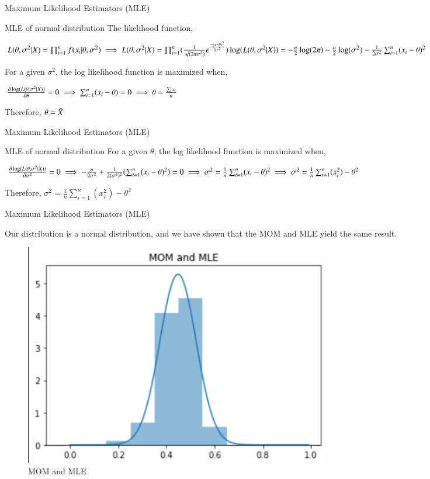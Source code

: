 \documentclass{beamer}
\begin{document}
\begin{frame}{Maximum Likelihood Estimators (MLE)}
\begin{block}{MLE of normal distribution}
The likelihood function,
\begin{center}
    $L(\theta, \sigma^2|X) = \prod_{i=1}^n f(x_i|\theta,\sigma^2)\\
    \implies L(\theta, \sigma^2|X) = \prod_{i=1}^n (\frac{1}{\sqrt(2\pi\sigma^2)}e^{\frac{-(x-\theta)^2}{2\sigma^2}})\\
    \log(L(\theta, \sigma^2|X)) = -\frac{n}{2}\log(2\pi)  -\frac{n}{2}\log(\sigma^2)  -\frac{1}{2\sigma^2}\sum_{i=1}^{n}(x_i-\theta)^2$
\end{center}
For a given $\sigma^2$, the log likelihood function is maximized when,
\begin{center}
 $\frac{\partial \log(L(\theta, \sigma^2|X))}{\partial \theta} = 0 \\
  \implies \sum_{i=1}^{n}(x_i-\theta) = 0
  \implies \theta = \frac{ \sum x_i}{n}$
\end{center}
Therefore, $\theta = \Bar{X}$
\end{block}
\end{frame}
\begin{frame}{Maximum Likelihood Estimators (MLE)}
\begin{block}{MLE of normal distribution}
For a given $\theta$, the log likelihood function is maximized when,
\begin{center}
 $\frac{\partial \log(L(\theta, \sigma^2|X))}{\partial \sigma^2} = 0 \\
  \implies -\frac{n}{2\sigma^2} + \frac{1}{2(\sigma^2)^2}(\sum_{i=1}^{n}(x_i-\theta)^2) = 0\\
  \implies \sigma^2 = \frac{1}{n}\sum_{i=1}^{n}(x_i-\theta)^2 \\
  \implies  \sigma^2 = \frac{1}{n}\sum_{i=1}^{n}(x_i^2) - \theta^2$
\end{center}
Therefore, $\sigma^2 = \frac{1}{n}\sum_{i=1}^{n}(x_i^2) - \theta^2$
\end{block}
\end{frame}
\begin{frame}{Maximum Likelihood Estimators (MLE)}
\begin{center}
    Our distribution is a normal distribution, and we have shown that the MOM and MLE yield the same result.
\end{center}
\begin{figure}[htp]
\includegraphics[width=0.65\textwidth]{Images/MOM_MLE.png}
\caption{MOM and MLE}
\end{figure}  
\end{frame}
\end{document}
